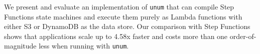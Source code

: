 \documentclass[letterpaper,twocolumn,10pt]{article}
\newcommand{\name}{\texttt{unum}}
\begin{document}
We present and evaluate an implementation of \name{} that can compile Step
Functions state machines and execute them purely as Lambda functions with
either S3 or DynamoDB as the data store. Our comparison with Step Functions
shows that applications scale up to 4.58x faster and costs more than one
order-of-magnitude less when running with \name{}. 







% 





\end{document}
